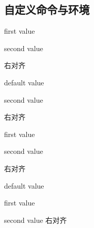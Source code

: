 \documentclass[twoside]{ctexart}
\begin{document}
    \subsection{自定义命令与环境}

            \newenvironment{newenv0}[2]
            {\begin{flushright}#1\par#2\par}
            {\end{flushright}}

            \begin{newenv0}{first value}{second value}
                右对齐
            \end{newenv0}

            \newenvironment{newenv1}[2][default value]
            {\begin{flushright}#1\par#2\par}
            {\end{flushright}}
            
            \begin{newenv1}{second value}
                右对齐
            \end{newenv1}

            \begin{newenv1}[first value]{second value}
                右对齐
            \end{newenv1}

            \begin{newenv1}{first value}{second value}
                右对齐
            \end{newenv1}
\end{document}
